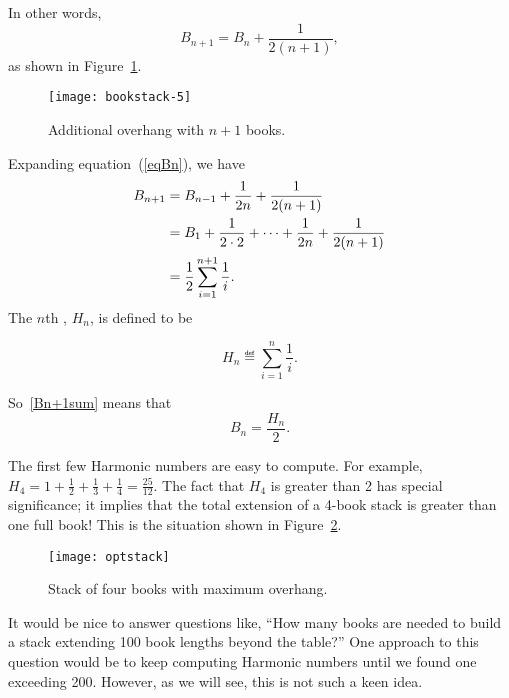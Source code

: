 In other words, 
\begin{equation}\label{eqBn}
    B_{n+1} = B_n + \frac{1}{2(n+1)},
\end{equation}
as shown in Figure~\ref{Bn1}.

\begin{figure}
\centerline{\texttt{[image: bookstack-5]}}
\caption{Additional overhang with $n+1$ books.}
\label{Bn1}
\end{figure}

Expanding equation~(\ref{eqBn}), we have
\begin{align}
B_{n+1} & = B_{n-1} + \frac{1}{2n} + \frac{1}{2(n+1)}\notag\\
        & = B_1 + \frac{1}{2 \cdot 2} + \cdots + \frac{1}{2n} +
            \frac{1}{2(n+1)}\notag\\
        & = \frac{1}{2}\sum_{i=1}^{n+1} \frac{1}{i}.\label{Bn+1sum}
\end{align}
The $n$th , $H_n$, is defined to be
\begin{definition}
\[
H_n \eqdef \sum_{i=1}^n \frac{1}{i}.
\]
\end{definition}
So~\eqref{Bn+1sum} means that
\[
B_n = \frac{H_n}{2}.
\]

The first few Harmonic numbers are easy to compute.  For example, $H_4 = 1
+ \frac{1}{2} + \frac{1}{3} + \frac{1}{4} = \frac{25}{12}$.  The fact that
$H_4$ is greater than 2 has special significance; it implies that the
total extension of a 4-book stack is greater than one full book!  This is
the situation shown in Figure~\ref{fig:optstack}.

\begin{figure}[htbp]
\centerline{\texttt{[image: optstack]}}
\caption{Stack of four books with maximum overhang.}
\label{fig:optstack}
\end{figure}


It would be nice to answer questions like, ``How many books are needed
to build a stack extending 100 book lengths beyond the table?''  One
approach to this question would be to keep computing Harmonic numbers
until we found one exceeding 200.  However, as we will see, this is
not such a keen idea.

